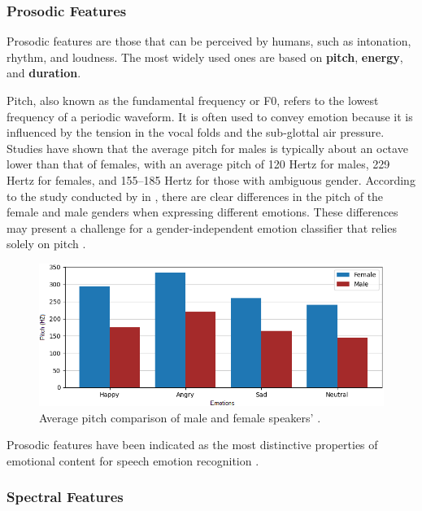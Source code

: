 \subsubsection{Prosodic Features}

Prosodic features are those that can be perceived by humans, such as intonation, rhythm, and loudness. The most widely used ones are based on \textbf{pitch}, \textbf{energy}, and \textbf{duration}.

Pitch, also known as the fundamental frequency or F0, refers to the lowest frequency of a periodic waveform. It is often used to convey emotion because it is influenced by the tension in the vocal folds and the sub-glottal air pressure. Studies have shown that the average pitch for males is typically about an octave lower than that of females, with an average pitch of 120 Hertz for males, 229 Hertz for females, and 155–185 Hertz for those with ambiguous gender. According to the study conducted by \citeauthor{ArputhaRathina2012} in \citeyear{ArputhaRathina2012}, there are clear differences in the pitch of the female and male genders when expressing different emotions. These differences may present a challenge for a gender-independent emotion classifier that relies solely on pitch \cite{ArputhaRathina2012}.

\begin{figure}[h]
  \centering
  \includegraphics[width=.8\linewidth]{figs/2_state_of_the_art/Average-Pitch-Comparison-of-Male-and-Female-speak-ers.png}
  \caption{Average pitch comparison of male and female speakers’ \cite{ArputhaRathina2012}.}
  \label{fig:avgpitch}
\end{figure}

Prosodic features have been indicated as the most distinctive properties of emotional content for speech emotion recognition \cite{ZhihongZeng2009}.

\subsubsection{Spectral Features}

